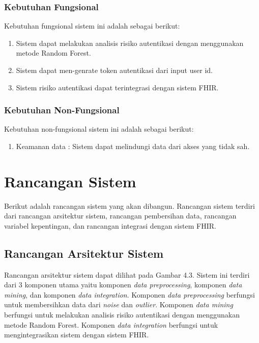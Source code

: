 \subsubsection{Kebutuhan Fungsional}
Kebutuhan fungsional sistem ini adalah sebagai berikut:
\begin{enumerate}
    \item Sistem dapat melakukan analisis risiko autentikasi dengan menggunakan metode Random Forest.
    \item Sistem dapat men-genrate token autentikasi dari input user id.
    \item Sistem risiko autentikasi dapat terintegrasi dengan sistem FHIR.
\end{enumerate}

\subsubsection{Kebutuhan Non-Fungsional}
Kebutuhan non-fungsional sistem ini adalah sebagai berikut:
\begin{enumerate}
    \item Keamanan data : Sistem dapat melindungi data dari akses yang tidak sah.
\end{enumerate}

\section{Rancangan Sistem}
Berikut adalah rancangan sistem yang akan dibangun. Rancangan sistem terdiri dari rancangan arsitektur sistem, rancangan pembersihan data, rancangan variabel kepentingan, dan rancangan integrasi dengan sistem FHIR.

\subsection{Rancangan Arsitektur Sistem}
Rancangan arsitektur sistem dapat dilihat pada Gambar 4.3. Sistem ini terdiri dari 3 komponen utama yaitu komponen \textit{data preprocessing}, komponen \textit{data mining}, dan komponen \textit{data integration}. Komponen \textit{data preprocessing} berfungsi untuk membersihkan data dari \textit{noise} dan \textit{outlier}. Komponen \textit{data mining} berfungsi untuk melakukan analisis risiko autentikasi dengan menggunakan metode Random Forest. Komponen \textit{data integration} berfungsi untuk mengintegrasikan sistem dengan sistem FHIR.

